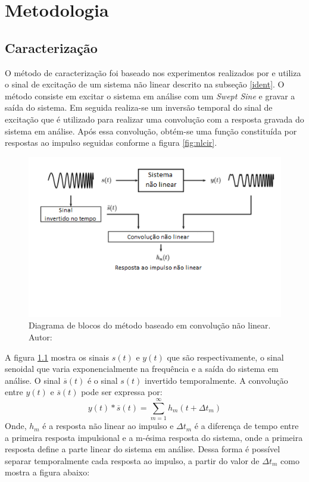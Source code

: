 \chapter{Metodologia} \label{cap3}

\section{Caracterização}

O método de caracterização foi baseado nos experimentos realizados por \cite{farina2001non} e utiliza o sinal de excitação de um sistema não linear descrito na subseção \ref{ident}. O método consiste em excitar o sistema em análise com um \textit{Swept Sine} e gravar a saída do sistema. Em seguida	realiza-se um inversão temporal do sinal de excitação que é utilizado para realizar uma convolução com a resposta gravada do sistema em análise. Após essa convolução, obtém-se uma função constituída por respostas ao impulso seguidas conforme a figura \ref{fig:nlcir}.

\begin{figure}[!htb]
	\centering
	\includegraphics[width=0.9\linewidth]{figuras/NLCM}
	\caption{Diagrama de blocos do método baseado em convolução não linear. Autor: \cite{novakdissertation}}
	\label{fig:nlcm}
\end{figure}

A figura \ref{fig:nlcm} mostra os sinais $s(t)$ e $y(t)$ que são respectivamente, o sinal senoidal que varia exponencialmente na frequência e a saída do sistema em análise. O sinal $\overline{s}(t)$ é o sinal $s(t)$ invertido temporalmente. A convolução entre $y(t)$ e $\overline{s}(t)$ pode ser expressa por:
\begin{equation}
y(t) \ast \overline{s}(t) = \sum_{m=1}^{\infty}h_{m}(t + \Delta t_{m})
\label{kernel}
\end{equation}
Onde, $h_{m}$ é a resposta não linear ao impulso e $\Delta t_{m}$ é a diferença de tempo entre a primeira resposta impulsional e a m-ésima resposta do sistema, onde a primeira resposta define a parte linear do sistema em análise. Dessa forma é possível separar temporalmente cada resposta ao impulso, a partir do valor de $\Delta t_{m}$ como mostra a figura abaixo:


